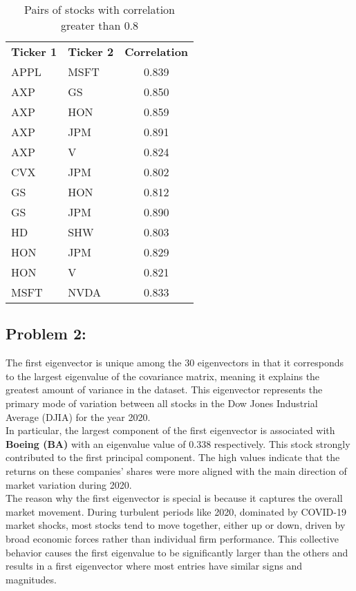 \documentclass{report}
\begin{document}
    \begin{table}[h]
    \centering
    \caption{Pairs of stocks with correlation greater than 0.8}
    \begin{tabular}{l l c}
        \textbf{Ticker 1} & \textbf{Ticker 2} & \textbf{Correlation} \\
        APPL  & MSFT  & 0.839 \\
        AXP   & GS    & 0.850 \\
        AXP   & HON   & 0.859 \\
        AXP   & JPM   & 0.891 \\
        AXP   & V     & 0.824 \\
        CVX   & JPM   & 0.802 \\
        GS    & HON   & 0.812 \\
        GS    & JPM   & 0.890 \\
        HD    & SHW   & 0.803 \\
        HON   & JPM   & 0.829 \\
        HON   & V     & 0.821 \\
        MSFT  & NVDA  & 0.833 \\
    \end{tabular}
\end{table}
\newpage
 
\subsection*{Problem 2:}

The first eigenvector is unique among the 30 eigenvectors in that it corresponds to the largest eigenvalue of the covariance matrix, meaning it explains the greatest amount of variance in the dataset. This eigenvector represents the primary mode of variation between all stocks in the Dow Jones Industrial Average (DJIA) for the year 2020. \\

In particular, the largest component of the first eigenvector is associated with \textbf{Boeing (BA)} with an eigenvalue value of 0.338 respectively. This stock strongly contributed to the first principal component. The high values indicate that the returns on these companies' shares were more aligned with the main direction of market variation during 2020. \\

The reason why the first eigenvector is special is because it captures the overall market movement. During turbulent periods like 2020, dominated by COVID-19 market shocks, most stocks tend to move together, either up or down, driven by broad economic forces rather than individual firm performance. This collective behavior causes the first eigenvalue to be significantly larger than the others and results in a first eigenvector where most entries have similar signs and magnitudes. \\
\end{document}
